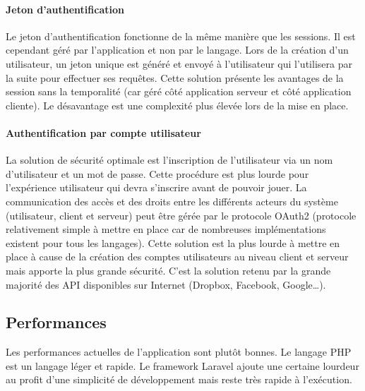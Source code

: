 
		\paragraph{Jeton d'authentification} %
		\label{par:jeton_d_authentification}
		
			Le jeton d'authentification fonctionne de la même manière que les sessions. Il est cependant géré par l'application et non par le langage. Lors de la création d'un utilisateur, un jeton unique est généré et envoyé à l'utilisateur qui l'utilisera par la suite pour effectuer ses requêtes. Cette solution présente les avantages de la session sans la temporalité (car géré côté application serveur et côté application cliente). Le désavantage est une complexité plus élevée lors de la mise en place.


		\paragraph{Authentification par compte utilisateur} %
		\label{par:authentification_par_compte_utilisateur}
		
			La solution de sécurité optimale est l'inscription de l'utilisateur via un nom d'utilisateur et un mot de passe. Cette procédure est plus lourde pour l'expérience utilisateur qui devra s'inscrire avant de pouvoir jouer. La communication des accès et des droits entre les différents acteurs du système (utilisateur, client et serveur) peut être gérée par le protocole OAuth2 (protocole relativement simple à mettre en place car de nombreuses implémentations existent pour tous les langages). Cette solution est la plus lourde à mettre en place à cause de la création des comptes utilisateurs au niveau client et serveur mais apporte la plus grande sécurité. C'est la solution retenu par la grande majorité des API disponibles sur Internet (Dropbox, Facebook, Google\dots).



	\subsection{Performances} %
	\label{sub:performances}

		Les performances actuelles de l'application sont plutôt bonnes. Le langage PHP est un langage léger et rapide. Le framework Laravel ajoute une certaine lourdeur au profit d'une simplicité de développement mais reste très rapide à l'exécution.\\


